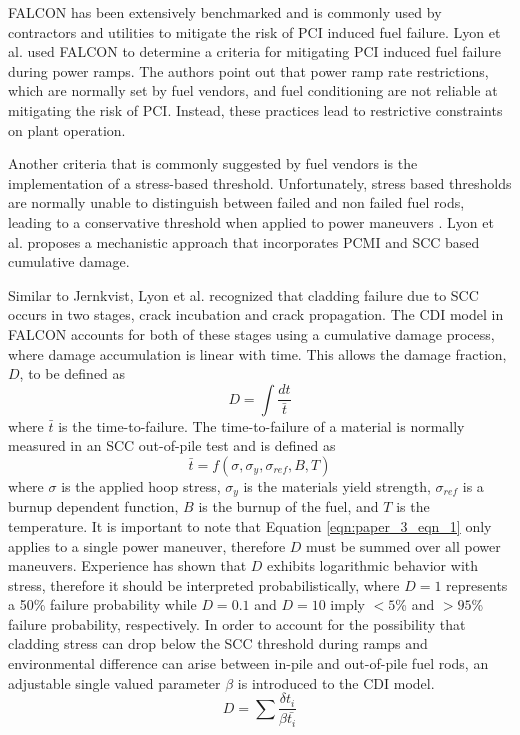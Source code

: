 \documentclass[edeposit,fullpage,11pt]{uiucthesis2009}
\begin{document}
FALCON has been extensively benchmarked and is commonly used by contractors and utilities to mitigate the risk of \gls{PCI} induced fuel failure.
Lyon et al. \cite{lyon_pci_2009} used FALCON  to determine a criteria for mitigating \gls{PCI} induced fuel failure during power ramps.
The authors point out that power ramp rate restrictions, which are normally set by fuel vendors, and fuel conditioning are not reliable at mitigating the risk of \gls{PCI}. 
Instead, these practices lead to restrictive constraints on plant operation.

Another criteria that is commonly suggested by fuel vendors is the implementation of a stress-based threshold.
Unfortunately, stress based thresholds are normally unable to distinguish between failed and non failed fuel rods, leading to a conservative threshold when applied to power maneuvers \cite{lyon_pci_2009}.
 Lyon et al. proposes a mechanistic approach that incorporates \gls{PCMI} and \gls{SCC} based cumulative damage.

Similar to Jernkvist,  Lyon et al. recognized that cladding failure due to \gls{SCC} occurs in two stages, crack incubation and crack propagation.
The \gls{CDI} model in FALCON accounts for both of these stages using a cumulative damage process, where damage accumulation is linear with time.
This allows the damage fraction, $D$, to be defined as 
\begin{equation}\label{eqn:paper_3_eqn_1}
D = \int \frac{dt}{\bar{t}}
\end{equation}
where $\bar{t}$ is the time-to-failure.
The time-to-failure of a material is normally measured in an \gls{SCC} out-of-pile test and is defined as
\begin{equation}
\bar{t} = f(\sigma,\sigma_y,\sigma_{ref},B,T)
\end{equation}
where $\sigma$ is the applied hoop stress, $\sigma_y$ is the materials yield strength, $\sigma_{ref}$ is a burnup dependent function, $B$ is the burnup of the fuel, and $T$ is the temperature.
It is important to note that Equation \ref{eqn:paper_3_eqn_1} only applies to a single power maneuver, therefore $D$ must be summed over all power maneuvers. 
Experience has shown that $D$ exhibits logarithmic behavior with stress, therefore it should be interpreted probabilistically, where $D=1$ represents a 50\% failure probability while $D=0.1$ and $D=10$ imply  $<5$\% and $>95$\% failure probability, respectively.
In order to account for the possibility that cladding stress can drop below the \gls{SCC} threshold during ramps and environmental difference can arise between in-pile and out-of-pile fuel rods, an adjustable single valued parameter $\beta$ is introduced to the \gls{CDI} model. 
\begin{equation}
D = \sum \frac{\delta t_i}{\beta \bar{t_i}}
\end{equation}
\end{document}
